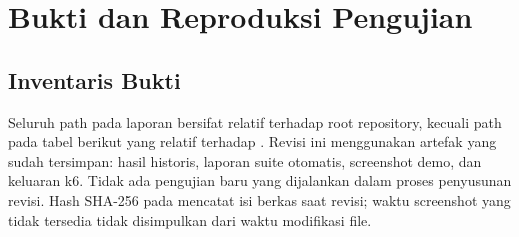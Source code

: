 \chapter{Bukti dan Reproduksi Pengujian}\label{app:bukti}
\section{Inventaris Bukti}
Seluruh path pada laporan bersifat relatif terhadap root repository, kecuali path pada tabel berikut yang relatif terhadap . Revisi ini menggunakan artefak yang sudah tersimpan: hasil historis, laporan suite otomatis, screenshot demo, dan keluaran k6. Tidak ada pengujian baru yang dijalankan dalam proses penyusunan revisi. Hash SHA-256 pada  mencatat isi berkas saat revisi; waktu screenshot yang tidak tersedia tidak disimpulkan dari waktu modifikasi file.

